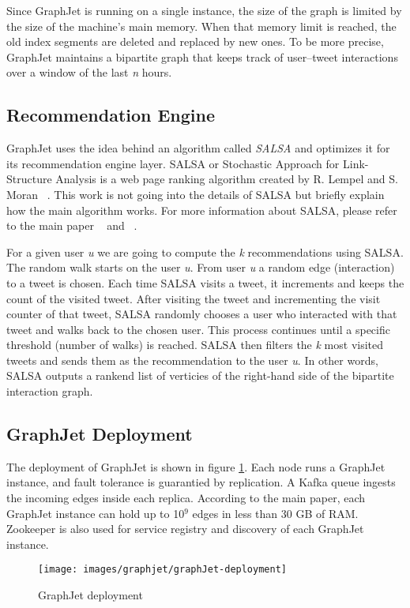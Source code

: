 Since GraphJet is running on a single instance, the size of the graph is limited by the size of the machine's main memory. When that memory limit is reached, the old index segments are deleted and replaced by new ones. To be more precise, GraphJet maintains a bipartite graph that keeps track of user–tweet interactions over a window of the last \textit{n} hours.

\subsection{Recommendation Engine}
\label{subsec:GraphJet-Recommendation-Engine}
GraphJet uses the idea behind an algorithm called \emph{SALSA} and optimizes it for its recommendation engine layer. SALSA or Stochastic Approach for Link-Structure Analysis is a web page ranking algorithm created by R. Lempel and S. Moran ~\cite{lempel2001salsa}. This work is not going into the details of SALSA but briefly explain how the main algorithm works. For more information about SALSA, please refer to the main paper ~\cite{lempel2001salsa} and ~\cite{sharma2016graphjet}.

For a given user \textit{u} we are going to compute the \textit{k} recommendations using SALSA. The random walk starts on the user \textit{u}. From user \textit{u} a random edge (interaction) to a tweet is chosen. Each time SALSA visits a tweet, it increments and keeps the count of the visited tweet. After visiting the tweet and incrementing the visit counter of that tweet, SALSA randomly chooses a user who interacted with that tweet and walks back to the chosen user. This process continues until a specific threshold (number of walks) is reached. SALSA then filters the \textit{k} most visited tweets and sends them as the recommendation to the user \textit{u}. In other words, SALSA outputs a rankend list of verticies of the right-hand side of the bipartite interaction graph.

\subsection{GraphJet Deployment}
\label{subsec:GraphJet-Deployment}
The deployment of GraphJet is shown in figure \ref{fig:graphJet-deployment}. Each node runs a GraphJet instance, and fault tolerance is guarantied by replication. A Kafka queue ingests the incoming edges inside each replica. According to the main paper, each GraphJet instance can hold up to 10$^9$ edges in less than 30 GB of RAM. Zookeeper is also used for service registry and discovery of each GraphJet instance.
\begin{figure}[!h]
	\centering
	\texttt{[image: images/graphjet/graphJet-deployment]}
	\caption{GraphJet deployment}
	\label{fig:graphJet-deployment}
\end{figure}
